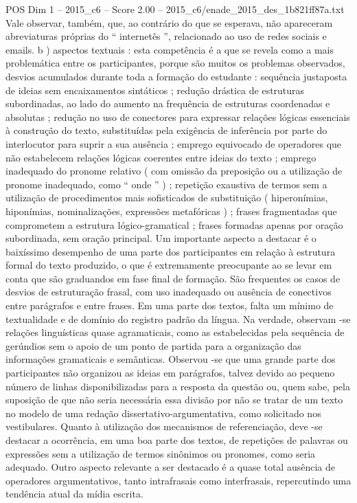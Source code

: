 \begin{textsample}{POS Dim 1 – 2015\_c6 – Score 2.00 – 2015\_c6/enade\_2015\_des\_1b821ff87a.txt}
Vale observar, também, que, ao contrário do que se esperava, não apareceram abreviaturas próprias do “ internetês ”, relacionado ao uso de redes sociais e emails. b ) aspectos textuais : esta competência é a que se revela como a mais problemática entre os participantes, porque são muitos os problemas observados, desvios acumulados durante toda a formação do estudante : sequência justaposta de ideias sem encaixamentos sintáticos ; redução drástica de estruturas subordinadas, ao lado do aumento na frequência de estruturas coordenadas e absolutas ; redução no uso de conectores para expressar relações lógicas essenciais à construção do texto, substituídas pela exigência de inferência por parte do interlocutor para suprir a sua ausência ; emprego equivocado de operadores que não estabelecem relações lógicas coerentes entre ideias do texto ; emprego inadequado do pronome relativo ( com omissão da preposição ou a utilização de pronome inadequado, como “ onde ” ) ; repetição exaustiva de termos sem a utilização de procedimentos mais sofisticados de substituição ( hiperonímias, hiponímias, nominalizações, expressões metafóricas ) ; frases fragmentadas que comprometem a estrutura lógico-gramatical ; frases formadas apenas por oração subordinada, sem oração principal.
Um importante aspecto a destacar é o baixíssimo desempenho de uma parte dos participantes em relação à estrutura formal do texto produzido, o que é extremamente preocupante ao se levar em conta que são graduandos em fase final de formação.
São frequentes os casos de desvios de estruturação frasal, com uso inadequado ou ausência de conectivos entre parágrafos e entre frases.
Em uma parte dos textos, falta um mínimo de textualidade e de domínio do registro padrão da língua.
Na verdade, observam -se relações linguísticas quase agramaticais, como as estabelecidas pela sequência de gerúndios sem o apoio de um ponto de partida para a organização das informações gramaticais e semânticas.
Observou -se que uma grande parte dos participantes não organizou as ideias em parágrafos, talvez devido ao pequeno número de linhas disponibilizadas para a resposta da questão ou, quem sabe, pela suposição de que não seria necessária essa divisão por não se tratar de um texto no modelo de uma redação dissertativo-argumentativa, como solicitado nos vestibulares.
Quanto à utilização dos mecanismos de referenciação, deve -se destacar a ocorrência, em uma boa parte dos textos, de repetições de palavras ou expressões sem a utilização de termos sinônimos ou pronomes, como seria adequado.
Outro aspecto relevante a ser destacado é a quase total ausência de operadores argumentativos, tanto intrafrasais como interfrasais, repercutindo uma tendência atual da mídia escrita.

\end{textsample}
